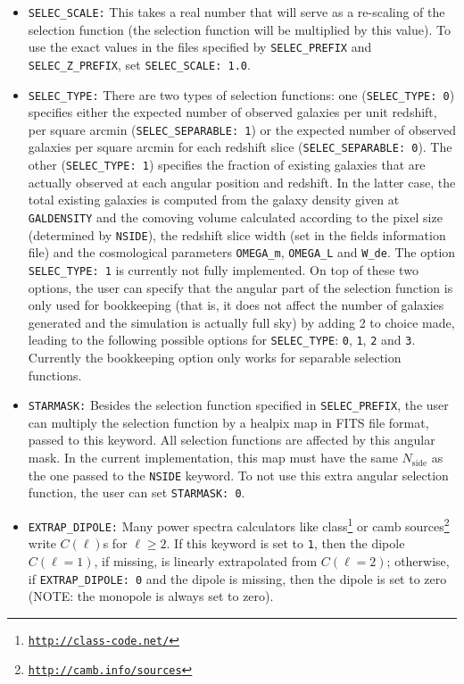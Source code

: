 \documentclass[12pt]{book} %
\newcommand{\nv}[1]{\mathrm{#1}}                 %
\begin{document}
\begin{itemize}
 \item {\tt SELEC\_SCALE:} This takes a real number that will serve as a re-scaling of the selection 
   function (the selection function will be multiplied by this value). To use the exact values in the 
   files specified by {\tt SELEC\_PREFIX} and {\tt SELEC\_Z\_PREFIX}, set {\tt SELEC\_SCALE: 1.0}.

\item {\tt SELEC\_TYPE:} There are two types of selection functions: one ({\tt SELEC\_TYPE: 0}) 
  specifies either the expected number of observed galaxies per unit redshift, per square arcmin 
  ({\tt SELEC\_SEPARABLE: 1}) or the expected number of observed galaxies per square arcmin for each 
  redshift slice ({\tt SELEC\_SEPARABLE: 0}). The other ({\tt SELEC\_TYPE: 1}) specifies the 
  fraction of existing galaxies that are actually observed at each angular 
  position and redshift. In the latter case, the total existing galaxies 
  is computed from the galaxy density given at {\tt GALDENSITY} and the comoving volume calculated 
  according to the pixel size (determined by {\tt NSIDE}), the redshift slice width (set in the 
  fields information file) and the cosmological parameters {\tt OMEGA\_m}, {\tt OMEGA\_L} and 
  {\tt W\_de}. The option {\tt SELEC\_TYPE: 1} is currently not fully implemented. On top of these 
  two options, the user can specify that the angular part of the selection function is only 
  used for bookkeeping (that is, it does not affect the number of galaxies generated and the 
  simulation is actually full sky) by adding 2 to choice made, leading to the following possible 
  options for {\tt SELEC\_TYPE}: {\tt 0}, {\tt 1}, {\tt 2} and {\tt 3}. Currently the bookkeeping 
  option only works for separable selection functions. 

\item {\tt STARMASK:} Besides the selection function specified in {\tt SELEC\_PREFIX}, the user 
  can multiply the selection function by a {\sc healpix} map in FITS file format, passed to this 
  keyword. All selection functions are affected by this angular mask. In the current implementation, 
  this map must have the same $N_{\nv{side}}$ as the one passed to the {\tt NSIDE} keyword.
  To not use this extra angular selection function, the user can set {\tt STARMASK: 0}.

\item {\tt EXTRAP\_DIPOLE:} Many power spectra calculators like 
  {\sc class}\footnote{\tt{\href{http://class-code.net/}{http://class-code.net/}}} or 
  {\sc camb sources}\footnote{\tt{\href{http://camb.info/sources}{http://camb.info/sources}}} 
  write $C(\ell)$s for $\ell\geq 2$. If this keyword is set to {\tt 1}, then the dipole $C(\ell=1)$, 
  if missing, is linearly extrapolated from $C(\ell=2)$; otherwise, if {\tt EXTRAP\_DIPOLE: 0} and the 
  dipole is missing, then the dipole is set to zero (NOTE: the monopole is always set to zero).


\end{itemize}
\end{document}
